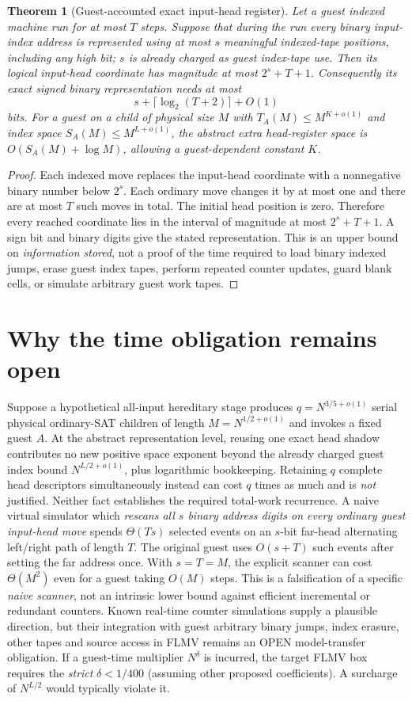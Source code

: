 \documentclass[10pt]{article}
\newtheorem{theorem}{Theorem}
\begin{document}
\begin{theorem}[Guest-accounted exact input-head register]
Let a guest indexed machine run for at most $T$ steps. Suppose that during the run every binary input-index address is represented using at most $s$ meaningful indexed-tape positions, including any high bit; $s$ is already charged as guest index-tape use. Then its logical input-head coordinate has magnitude at most $2^s+T+1$. Consequently its exact signed binary \emph{representation} needs at most
\[\boxed{s+\lceil\log_2(T+2)\rceil+O(1)}\]
bits. For a guest on a child of physical size $M$ with $T_A(M)\le M^{K+o(1)}$ and index space $S_A(M)\le M^{L+o(1)}$, the abstract extra head-register space is $O(S_A(M)+\log M)$, allowing a guest-dependent constant $K$.
\end{theorem}
\begin{proof}
Each indexed move replaces the input-head coordinate with a nonnegative binary number below $2^s$. Each ordinary move changes it by at most one and there are at most $T$ such moves in total. The initial head position is zero. Therefore every reached coordinate lies in the interval of magnitude at most $2^s+T+1$. A sign bit and binary digits give the stated representation. This is an upper bound on \emph{information stored}, not a proof of the time required to load binary indexed jumps, erase guest index tapes, perform repeated counter updates, guard blank cells, or simulate arbitrary guest work tapes. \end{proof}
\section{Why the time obligation remains open}
Suppose a hypothetical all-input hereditary stage produces $q=N^{3/5+o(1)}$ serial physical ordinary-SAT children of length $M=N^{1/2+o(1)}$ and invokes a fixed guest $A$. At the abstract representation level, reusing one exact head shadow contributes no new positive space exponent beyond the already charged guest index bound $N^{L/2+o(1)}$, plus logarithmic bookkeeping. Retaining $q$ complete head descriptors simultaneously instead can cost $q$ times as much and is \emph{not} justified. Neither fact establishes the required total-work recurrence.
A naive virtual simulator which \emph{rescans all $s$ binary address digits on every ordinary guest input-head move} spends $\Theta(Ts)$ selected events on an $s$-bit far-head alternating left/right path of length $T$. The original guest uses $O(s+T)$ such events after setting the far address once. With $s=T=M$, the explicit scanner can cost $\Theta(M^2)$ even for a guest taking $O(M)$ steps. This is a falsification of a specific \emph{naive scanner}, not an intrinsic lower bound against efficient incremental or redundant counters. Known real-time counter simulations supply a plausible direction, but their integration with guest arbitrary binary jumps, index erasure, other tapes and source access in FLMV remains an OPEN model-transfer obligation. If a guest-time multiplier $N^\delta$ is incurred, the target FLMV box requires the \emph{strict} $\delta<1/400$ (assuming other proposed coefficients). A surcharge of $N^{L/2}$ would typically violate it.
\end{document}
